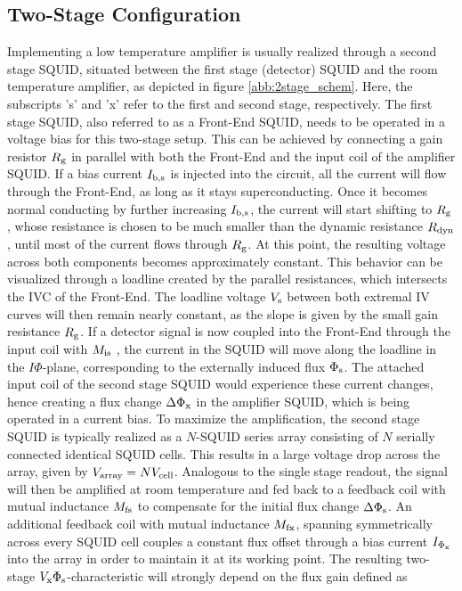 \subsection{Two-Stage Configuration}\label{subsec_2stage_theo}

Implementing a low temperature amplifier is usually realized through a second stage SQUID, situated between the first stage (detector) SQUID and the room temperature amplifier, as depicted in figure \ref{abb:2stage_schem}. Here, the subscripts 's' and 'x' refer to the first and second stage, respectively. The first stage SQUID, also referred to as a Front-End SQUID, needs to be operated in a voltage bias for this two-stage setup. This can be achieved by connecting a gain resistor $R_{\rm g}$ in parallel with both the Front-End and the input coil of the amplifier SQUID. If a bias current $I_{\rm b,s}$ is injected into the circuit, all the current will flow through the Front-End, as long as it stays superconducting. Once it becomes normal conducting by further increasing $I_{\rm b,s}$, the current will start shifting to $R_{\rm g}$, whose resistance is chosen to be much smaller than the dynamic resistance $R_{\rm dyn}$, until most of the current flows through $R_{\rm g}$. At this point, the resulting voltage across both components becomes approximately constant. This behavior can be visualized through a loadline created by the parallel resistances, which intersects the IVC of the Front-End. The loadline voltage $V_{\rm s}$ between both extremal IV curves will then remain nearly constant, as the slope is given by the small gain resistance $R_{\rm g}$. If a detector signal is now coupled into the Front-End through the input coil with $M_{\rm is}$ , the current in the SQUID will move along the loadline in the $I\Phi$-plane, corresponding to the externally induced flux $\Phi_{\rm s}$. The attached input coil of the second stage SQUID would experience these current changes, hence creating a flux change $\Delta\Phi_{\rm x}$ in the amplifier SQUID, which is being operated in a current bias. To maximize the amplification, the second stage SQUID is typically realized as a $N$-SQUID series array consisting of $N$ serially connected identical SQUID cells. This results in a large voltage drop across the array, given by $V_{\rm array}=NV_{\rm cell}$. Analogous to the single stage readout, the signal will then be amplified at room temperature and fed back to a feedback coil with mutual inductance $M_{\rm fs}$ to compensate for the initial flux change $\Delta\Phi_{\rm s}$. An additional feedback coil with mutual inductance $M_{\rm fx}$, spanning symmetrically across every SQUID cell couples a constant flux offset through a bias current $I_{\rm \Phi_x}$ into the array in order to maintain it at its working point. The resulting two-stage $V_{\rm x}\Phi_{\rm s}$-characteristic will strongly depend on the flux gain defined as


